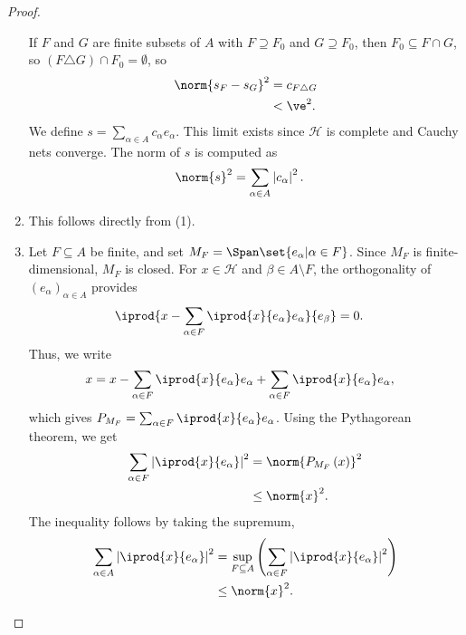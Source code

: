 \documentclass[10pt]{mypackage}
\begin{document}
\begin{proof}
\begin{enumerate}[(1)]
      If $F$ and $G$ are finite subsets of $A$ with $F\supseteq F_0$ and $G\supseteq F_0$, then $F_0\subseteq F\cap G$, so $\left(F\triangle G\right)\cap F_0 = \emptyset$, so
      \begin{align*}
        \norm{s_F - s_G}^2 &= c_{F\triangle G}\\
                           &< \ve^2.
      \end{align*}
      We define $s = \sum_{\alpha \in A}c_{\alpha}e_{\alpha}$. This limit exists since $\mathcal{H}$ is complete and Cauchy nets converge. The norm of $s$ is computed as
      \begin{align*}
        \norm{s}^2 &= \sum_{\alpha \in A}\left\vert c_{\alpha} \right\vert^2.
      \end{align*}
    \item This follows directly from (1).
    \item Let $F\subseteq A$ be finite, and set $M_F = \Span\set{e_{\alpha} | \alpha \in F}$. Since $M_F$ is finite-dimensional, $M_F$ is closed. For $x\in \mathcal{H}$ and $\beta \in A\setminus F$, the orthogonality of $\left(e_{\alpha}\right)_{\alpha \in A}$ provides
      \begin{align*}
        \iprod{x - \sum_{\alpha \in F} \iprod{x}{e_{\alpha}}e_{\alpha}}{e_{\beta}} &= 0.
      \end{align*}
      Thus, we write
      \begin{align*}
        x &= x -\sum_{\alpha \in F} \iprod{x}{e_{\alpha}}e_{\alpha} + \sum_{\alpha \in F} \iprod{x}{e_{\alpha}}e_{\alpha},
      \end{align*}
      which gives $P_{M_F} = \sum_{\alpha \in F} \iprod{x}{e_{\alpha}}e_{\alpha}$. Using the Pythagorean theorem, we get
      \begin{align*}
        \sum_{\alpha \in F} \left\vert \iprod{x}{e_{\alpha}} \right\vert^2 &= \norm{P_{M_F}\left(x\right)}^2\\
                                                                           &\leq \norm{x}^2.
      \end{align*}
      The inequality follows by taking the supremum,
      \begin{align*}
        \sum_{\alpha \in A} \left\vert \iprod{x}{e_{\alpha}} \right\vert^2 &= \sup_{F\subseteq A}\left(\sum_{\alpha \in F}\left\vert \iprod{x}{e_{\alpha}} \right\vert^2\right)\\
                                                                           &\leq \norm{x}^2.
      \end{align*}

\end{enumerate}
\end{proof}
\end{document}
